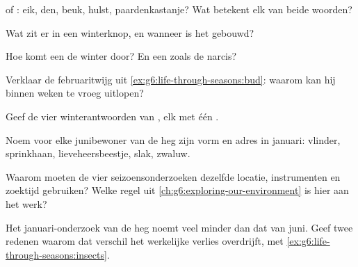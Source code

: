 \begin{exercise}[$\star$]\label{exo:g6:life-through-seasons:2}
 of : eik, den, beuk, hulst, paardenkastanje?
Wat betekent elk van beide woorden?
\end{exercise}

\begin{exercise}[$\star$]\label{exo:g6:life-through-seasons:3}
Wat zit er in een winterknop, en wanneer is het gebouwd?
\end{exercise}

\begin{exercise}[$\star$]\label{exo:g6:life-through-seasons:4}
Hoe komt een  de winter door? En een 
zoals de narcis?
\end{exercise}

\begin{exercise}[$\star$]\label{exo:g6:life-through-seasons:5}
Verklaar de februaritwijg uit \cref{ex:g6:life-through-seasons:bud}:
waarom kan hij binnen weken te vroeg uitlopen?
\end{exercise}

\begin{exercise}[$\star$]\label{exo:g6:life-through-seasons:6}
Geef de vier winterantwoorden van , elk met één .
\end{exercise}

\begin{exercise}[$\star\star$]\label{exo:g6:life-through-seasons:7}
Noem voor elke junibewoner van de heg zijn vorm en adres in januari:
vlinder, sprinkhaan, lieveheersbeestje, slak, zwaluw.
\end{exercise}

\begin{exercise}[$\star\star$]\label{exo:g6:life-through-seasons:8}
Waarom moeten de vier seizoensonderzoeken dezelfde locatie, instrumenten
en zoektijd gebruiken? Welke regel uit
\cref{ch:g6:exploring-our-environment} is hier aan het werk?
\end{exercise}

\begin{exercise}[$\star\star$]\label{exo:g6:life-through-seasons:9}
Het januari-onderzoek van de heg noemt veel minder  dan dat
van juni. Geef twee redenen waarom dat verschil het werkelijke verlies
overdrijft, met \cref{ex:g6:life-through-seasons:insects}.
\end{exercise}

